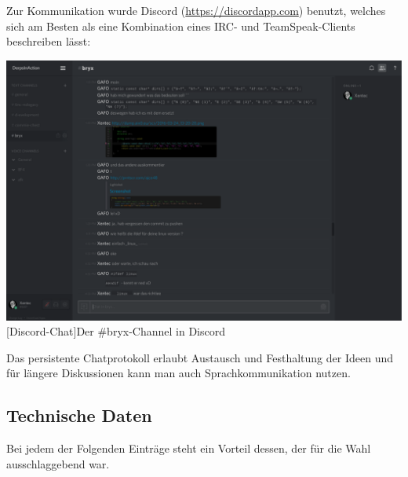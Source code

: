 \documentclass[12pt,a4paper]{article}
\begin{document}
Zur Kommunikation wurde Discord (\url{https://discordapp.com}) benutzt, welches sich am Besten als eine Kombination eines IRC- und TeamSpeak-Clients
beschreiben lässt:

\begin{minipage}{\linewidth}
	\centering
	\includegraphics[width=0.6\linewidth]{pics/bryx-chat.png}
	[Discord-Chat]{Der \#bryx-Channel in Discord}
	\label{fig:discord}
\end{minipage}

Das persistente Chatprotokoll erlaubt Austausch und Festhaltung der Ideen und für längere Diskussionen kann man auch Sprachkommunikation nutzen.

\subsection{Technische Daten}
Bei jedem der Folgenden Einträge steht ein Vorteil dessen, der für die Wahl ausschlaggebend war.
\end{document}
